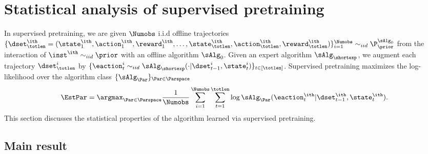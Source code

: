 \documentclass[10pt]{article}
\begin{document}
\section{Statistical analysis of supervised pretraining}\label{sec:supervised-pretraining}

In supervised pretraining, we are given $\Numobs$ i.i.d offline trajectories $\{\dset^\ith_\totlen =  (\state^\ith_1,\action^\ith_1, \reward^\ith_1, \ldots, \state^\ith_\totlen, \allowbreak \action^\ith_\totlen, \allowbreak\reward^\ith_\totlen) \}_{i=1}^\Numobs \sim_{iid} \P_\prior^{\sAlg_0}$ from the interaction of $\inst^\ith \sim_{iid} \prior$ with an offline algorithm $\sAlg_0$. Given an expert algorithm $\sAlg_{\shortexp}$, we augment each trajectory $\dset_{\totlen}^i$ by $\{ \eaction_t^i \sim_{iid} \sAlg_{\shortexp}( \cdot |\dset_{t-1}^i, \state_t^i)\}_{t \in [\totlen]}$. Supervised pretraining maximizes the log-likelihood over the algorithm class $\{ \sAlg_\Par\}_{\Par\in\Parspace}$
\begin{align}
\EstPar=\argmax_{\Par\in\Parspace}  \frac{1}{\Numobs}\sum_{i=1}^\Numobs\sum_{t=1}^\totlen\log \sAlg_\Par(\eaction^\ith_{t}|\dset_{t-1}^\ith,\state^\ith_t). \label{eq:general_mle}
\end{align}
This section discusses the statistical properties of the algorithm learned via supervised pretraining. 




\subsection{Main result}
\end{document}
